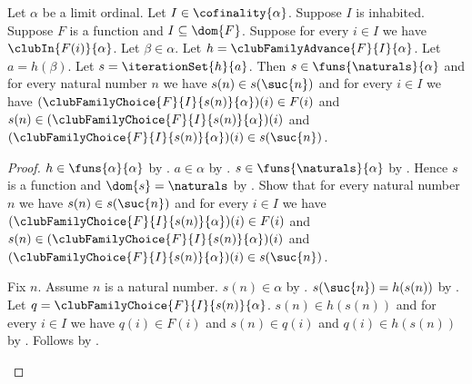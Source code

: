 \begin{proposition}\label{club_family_iteration_properties}
    Let $\alpha$ be a limit ordinal.
    Let $I\in\cofinality{\alpha}$.
    Suppose $I$ is inhabited.
    Suppose $F$ is a function and $I\subseteq\dom{F}$.
    Suppose for every $i\in I$ we have $\clubIn{F(i)}{\alpha}$.
    Let $\beta\in\alpha$.
    Let $h=\clubFamilyAdvance{F}{I}{\alpha}$.
    Let $a=h(\beta)$.
    Let $s=\iterationSet{h}{a}$.
    Then $s\in\funs{\naturals}{\alpha}$ and
        for every natural number $n$ we have
            $s(n)\in s(\suc{n})$ and for every $i\in I$ we have
                $(\clubFamilyChoice{F}{I}{s(n)}{\alpha})(i)\in F(i)$ and
                $s(n)\in(\clubFamilyChoice{F}{I}{s(n)}{\alpha})(i)$ and
                $(\clubFamilyChoice{F}{I}{s(n)}{\alpha})(i)
                    \in s(\suc{n})$.
\end{proposition}
\begin{proof}
    $h\in\funs{\alpha}{\alpha}$
        by .
    $a\in\alpha$ by .
    $s\in\funs{\naturals}{\alpha}$
        by .
    Hence $s$ is a function and $\dom{s}=\naturals$
        by .
    Show that for every natural number $n$ we have
        $s(n)\in s(\suc{n})$ and for every $i\in I$ we have
            $(\clubFamilyChoice{F}{I}{s(n)}{\alpha})(i)\in F(i)$ and
            $s(n)\in(\clubFamilyChoice{F}{I}{s(n)}{\alpha})(i)$ and
            $(\clubFamilyChoice{F}{I}{s(n)}{\alpha})(i)
                \in s(\suc{n})$.
    \begin{subproof}
        Fix $n$.
        Assume $n$ is a natural number.
        $s(n)\in\alpha$ by .
        $s(\suc{n})=h(s(n))$
            by .
        Let $q=\clubFamilyChoice{F}{I}{s(n)}{\alpha}$.
        $s(n)\in h(s(n))$ and for every $i\in I$ we have
            $q(i)\in F(i)$ and $s(n)\in q(i)$ and
            $q(i)\in h(s(n))$
            by .
        Follows by \auto.
    \end{subproof}
\end{proof}

